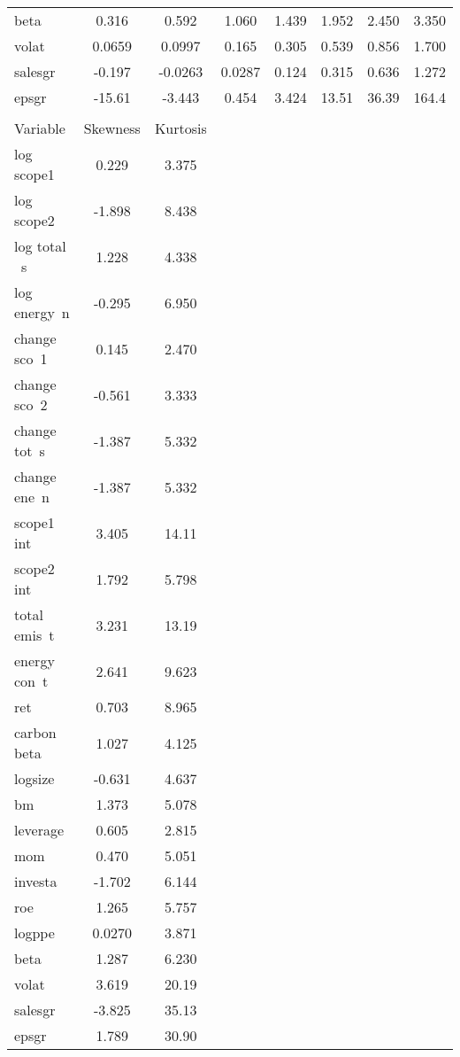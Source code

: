 \documentclass[]{article}
\begin{document}
\begin{tabular}{lccccccc}
beta & 0.316 & 0.592 & 1.060 & 1.439 & 1.952 & 2.450 & 3.350 \\
volat & 0.0659 & 0.0997 & 0.165 & 0.305 & 0.539 & 0.856 & 1.700 \\
salesgr & -0.197 & -0.0263 & 0.0287 & 0.124 & 0.315 & 0.636 & 1.272 \\
epsgr & -15.61 & -3.443 & 0.454 & 3.424 & 13.51 & 36.39 & 164.4 \\
 &  &  &  &  &  &  &  \\
Variable & Skewness & Kurtosis &  &  &  &  &  \\
log scope1 & 0.229 & 3.375 &  &  &  &  &  \\
log scope2 & -1.898 & 8.438 &  &  &  &  &  \\
log total ~s & 1.228 & 4.338 &  &  &  &  &  \\
log energy~n & -0.295 & 6.950 &  &  &  &  &  \\
change sco~1 & 0.145 & 2.470 &  &  &  &  &  \\
change sco~2 & -0.561 & 3.333 &  &  &  &  &  \\
change tot~s & -1.387 & 5.332 &  &  &  &  &  \\
change ene~n & -1.387 & 5.332 &  &  &  &  &  \\
scope1 int & 3.405 & 14.11 &  &  &  &  &  \\
scope2 int & 1.792 & 5.798 &  &  &  &  &  \\
total emis~t & 3.231 & 13.19 &  &  &  &  &  \\
energy con~t & 2.641 & 9.623 &  &  &  &  &  \\
ret & 0.703 & 8.965 &  &  &  &  &  \\
carbon beta & 1.027 & 4.125 &  &  &  &  &  \\
logsize & -0.631 & 4.637 &  &  &  &  &  \\
bm & 1.373 & 5.078 &  &  &  &  &  \\
leverage & 0.605 & 2.815 &  &  &  &  &  \\
mom & 0.470 & 5.051 &  &  &  &  &  \\
investa & -1.702 & 6.144 &  &  &  &  &  \\
roe & 1.265 & 5.757 &  &  &  &  &  \\
logppe & 0.0270 & 3.871 &  &  &  &  &  \\
beta & 1.287 & 6.230 &  &  &  &  &  \\
volat & 3.619 & 20.19 &  &  &  &  &  \\
salesgr & -3.825 & 35.13 &  &  &  &  &  \\
 epsgr & 1.789 & 30.90 &  &  &  &  &  \\ \hline
\end{tabular}
\end{document}
